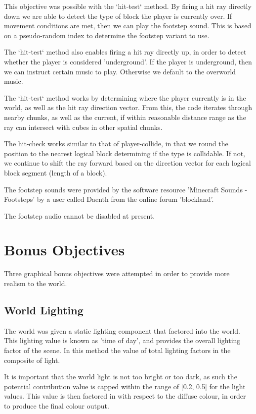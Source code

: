 \documentclass{book}
\begin{document}
This objective was possible with the `hit-test` method.  By firing a hit ray directly down we are able to detect the type of block the player is currently over.  If movement conditions are met, then we can play the footstep sound.  This is based on a pseudo-random index to determine the footstep variant to use.
    
The `hit-test` method also enables firing a hit ray directly up, in order to detect whether the player is considered 'underground'.  If the player is underground, then we can instruct certain music to play.  Otherwise we default to the overworld music.
    
The `hit-test` method works by determining where the player currently is in the world, as well as the hit ray direction vector.  From this, the code iterates through nearby chunks, as well as the current, if within reasonable distance range as the ray can intersect with cubes in other spatial chunks.
    
The hit-check works similar to that of player-collide, in that we round the position to the nearest logical block determining if the type is collidable.  If not, we continue to shift the ray forward based on the direction vector for each logical block segment (length of a block).
    
The footstep sounds were provided by the software resource 'Minecraft Sounds - Footsteps' by a user called Daenth from the online forum 'blockland'.
    
The footstep audio cannot be disabled at present.
    
\section{Bonus Objectives}
Three graphical bonus objectives were attempted in order to provide more realism to the world.
    
\subsection{World Lighting}
The world was given a static lighting component that factored into the world.  This lighting value is known as 'time of day', and provides the overall lighting factor of the scene.  In this method the value of total lighting factors in the composite of light.
    
It is important that the world light is not too bright or too dark, as such the potential contribution value is capped within the range of [0.2, 0.5] for the light values.  This value is then factored in with respect to the diffuse colour, in order to produce the final colour output.
    
\end{document}
